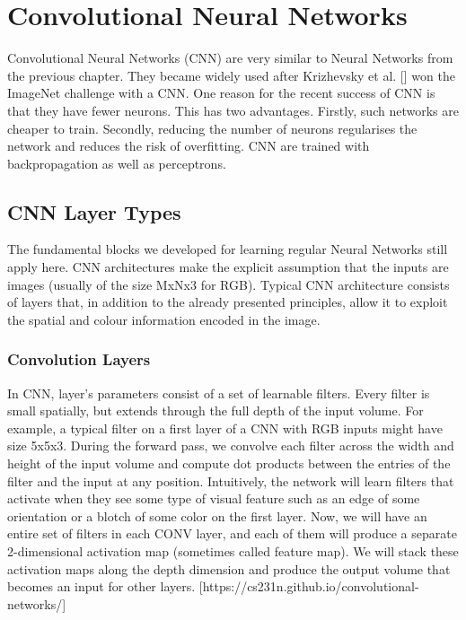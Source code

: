 \section{Convolutional Neural Networks}

Convolutional Neural Networks (CNN) are very similar to Neural Networks from the previous chapter. They became widely used after Krizhevsky et al. [] won the ImageNet challenge with a CNN. One reason for the recent success of CNN is that they have fewer neurons. This has two advantages. Firstly, such networks are cheaper to train. Secondly, reducing the number of neurons regularises the network and reduces the risk of overfitting. CNN are trained with backpropagation as well as perceptrons.  

\subsection{CNN Layer Types}
The fundamental blocks we developed for learning regular Neural Networks still apply here. CNN architectures make the explicit assumption that the inputs are images (usually of the size MxNx3 for RGB). Typical CNN architecture consists of layers that, in addition to the already presented principles, allow it to exploit the spatial and colour information encoded in the image.

\subsubsection{Convolution Layers}

In CNN, layer’s parameters consist of a set of learnable filters. Every filter is small spatially, but extends through the full depth of the input volume. For example, a typical filter on a first layer of a CNN with RGB inputs might have size 5x5x3. During the forward pass, we convolve each filter across the width and height of the input volume and compute dot products between the entries of the filter and the input at any position. Intuitively, the network will learn filters that activate when they see some type of visual feature such as an edge of some orientation or a blotch of some color on the first layer. Now, we will have an entire set of filters in each CONV layer, and each of them will produce a separate 2-dimensional activation map (sometimes called feature map). We will stack these activation maps along the depth dimension and produce the output volume that becomes an input for other layers. [https://cs231n.github.io/convolutional-networks/]

